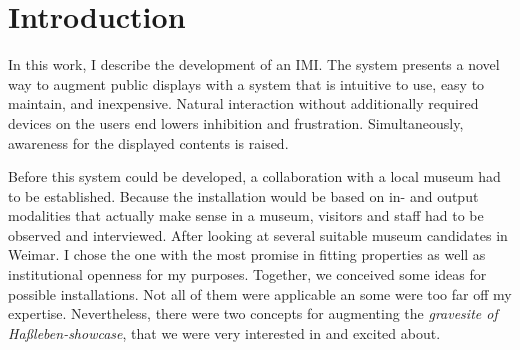 \chapter{Introduction}
\label{introduction}


In this work, I describe the development of an \ac{IMI}. The system presents a novel way to augment public displays with a system that is intuitive to use, easy to maintain, and inexpensive. Natural interaction without additionally required devices on the users end lowers inhibition and frustration. Simultaneously, awareness for the displayed contents is raised.

Before this system could be developed, a collaboration with a local museum had to be established. Because the installation would be based on in- and output modalities that actually make sense in a museum, visitors and staff had to be observed and interviewed. After looking at several suitable museum candidates in Weimar. I chose the one with the most promise in fitting properties as well as institutional openness for my purposes. Together, we conceived some ideas for possible installations. Not all of them were applicable an some were too far off my expertise. Nevertheless, there were two concepts for augmenting the \textit{gravesite of Haßleben-showcase}, that we were very interested in and excited about.

